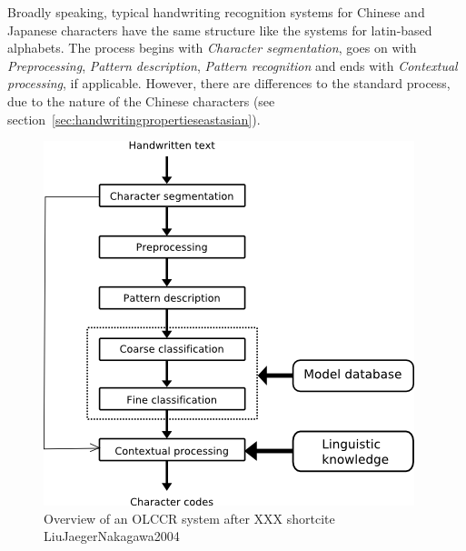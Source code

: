 Broadly speaking, typical handwriting recognition systems for Chinese and 
Japanese characters have the same structure like the systems for latin-based 
alphabets. The process begins with \emph{Character segmentation}, 
goes on with \emph{Preprocessing}, \emph{Pattern description}, 
\emph{Pattern recognition} and ends with \emph{Contextual processing}, 
if applicable. However, there are differences to the standard process, due to 
the nature of the Chinese characters (see 
section~\ref{sec:handwritingpropertieseastasian}).

\begin{figure}[htbp]
\includegraphics[scale=0.5]{images/olccrSystemOverview.png}
\caption{Overview of an OLCCR system after XXX shortcite LiuJaegerNakagawa2004 }
\label{fig:olccrsystemoverview}
\end{figure}

